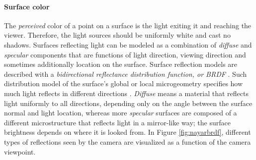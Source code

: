 \paragraph{Surface color}
The \emph{perceived} color of a point on a surface is the light exiting it and reaching the viewer.
Therefore, the light sources should be uniformly white and cast no shadows.
Surfaces reflecting light can be modeled as a combination of \emph{diffuse} and \emph{specular} components that are functions of light direction, viewing direction and sometimes additionally location on the surface.
Surface reflection models are described with a \emph{bidirectional reflectance distribution function, or BRDF} \cite{nicodemus1965directional}.
Such distribution model of the surface's global or local microgeometry specifies how much light reflects in different directions \cite{nayar1991surface}. %
\emph{Diffuse} means a material that reflects light uniformly to all directions, depending only on the angle between the surface normal and light location, whereas more \emph{specular} surfaces are composed of a different microstructure that reflects light in a mirror-like way; the surface brightness depends on where it is looked from.
In Figure \ref{fig:nayarbrdf}, different types of reflections seen by the camera are visualized as a function of the camera viewpoint.


